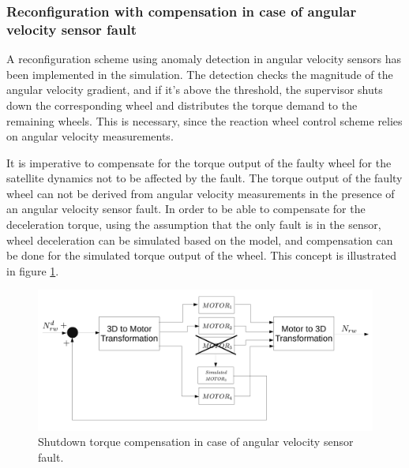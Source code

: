 \subsubsection{Reconfiguration with compensation in case of angular velocity sensor fault}



A reconfiguration scheme using anomaly detection in angular velocity sensors has been implemented in the simulation. The detection checks the magnitude of the angular velocity gradient, and if it's above the threshold, the supervisor shuts down the corresponding wheel and distributes the torque demand to the remaining wheels. This is necessary, since the reaction wheel control scheme relies on angular velocity measurements.

It is imperative to compensate for the torque output of the faulty wheel for the satellite dynamics not to be affected by the fault. The torque output of the faulty wheel can not be derived from angular velocity measurements in the presence of an angular velocity sensor fault. In order to be able to compensate for the deceleration torque, using the assumption that the only fault is in the sensor, wheel deceleration can be simulated based on the model, and compensation can be done for the simulated torque output of the wheel. This concept is illustrated in figure \ref{fig:angFaultCompensation}.


\begin{figure}
	\centering
	\includegraphics[width=120mm]{figures/simulatedCompensation}
	\caption{Shutdown torque compensation in case of angular velocity sensor fault.}
	\label{fig:angFaultCompensation}
\end{figure} 


